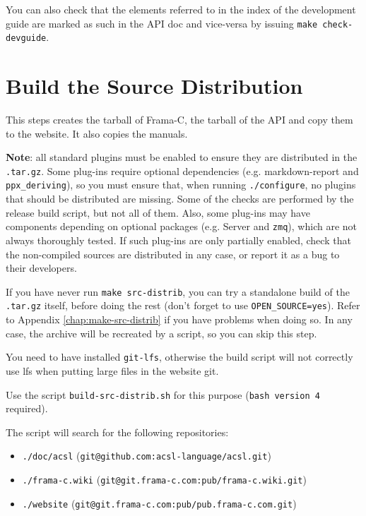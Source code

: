 You can also check that the elements referred to in the index of the
development guide are marked as such in the API doc and vice-versa
by issuing \texttt{make check-devguide}.

\section{Build the Source Distribution}
\label{sec:build-source-distr}

This steps creates the tarball of Frama-C, the tarball of the API and
copy them to the website. It also copies the manuals.

\textbf{Note}: all standard plugins must be enabled to ensure they are distributed
in the \verb+.tar.gz+. Some plug-ins require optional dependencies
(e.g. markdown-report and \verb+ppx_deriving+), so you must ensure that,
when running \verb+./configure+, no plugins that should be distributed are missing.
Some of the checks are performed by the release build script, but not all of them.
Also, some plug-ins may have components depending on optional packages
(e.g. Server and \verb+zmq+), which are not always thoroughly tested. If such
plug-ins are only partially enabled, check that the non-compiled sources are
distributed in any case, or report it as a bug to their developers.

If you have never run \verb+make src-distrib+, you can try a standalone build
of the \verb+.tar.gz+ itself, before doing the rest (don't forget to use
\verb+OPEN_SOURCE=yes+).
Refer to Appendix \ref{chap:make-src-distrib} if you have problems when
doing so. In any case, the archive will be recreated by a script, so you can
skip this step.

You need to have installed \texttt{git-lfs}, otherwise the build
script will not correctly use lfs when putting large files in the
website git.

 Use the script
\texttt{build-src-distrib.sh} for this purpose (\texttt{bash version
  4} required).

The script will search for the following repositories:

\begin{itemize}
  \item \texttt{./doc/acsl} (\texttt{git@github.com:acsl-language/acsl.git})
  \item \texttt{./frama-c.wiki} (\texttt{git@git.frama-c.com:pub/frama-c.wiki.git})
  \item \texttt{./website} (\texttt{git@git.frama-c.com:pub/pub.frama-c.com.git})
\end{itemize}


